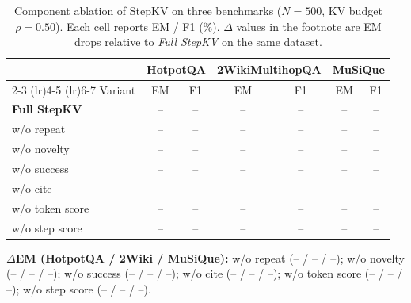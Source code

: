 %

\begin{table}[t]
\centering
\small
\setlength{\tabcolsep}{5pt}
\caption{Component ablation of StepKV on three benchmarks ($N=500$, KV budget $\rho=0.50$).
Each cell reports EM / F1 (\%).
$\Delta$ values in the footnote are EM drops relative to \textit{Full StepKV} on the same dataset.}
\label{tab:stepkv-ablation}
\begin{tabular}{lcccccc}
\toprule
& \multicolumn{2}{c}{HotpotQA} & \multicolumn{2}{c}{2WikiMultihopQA} & \multicolumn{2}{c}{MuSiQue} \\
\cmidrule(lr){2-3} \cmidrule(lr){4-5} \cmidrule(lr){6-7}
Variant & EM & F1 & EM & F1 & EM & F1 \\
\midrule
\textbf{Full StepKV} & -- & -- & -- & -- & -- & -- \\
w/o repeat           & -- & -- & -- & -- & -- & -- \\
w/o novelty          & -- & -- & -- & -- & -- & -- \\
w/o success          & -- & -- & -- & -- & -- & -- \\
w/o cite             & -- & -- & -- & -- & -- & -- \\
w/o token score      & -- & -- & -- & -- & -- & -- \\
w/o step score       & -- & -- & -- & -- & -- & -- \\
\bottomrule
\end{tabular}

\vspace{0.4em}
{\footnotesize
\textbf{$\Delta$EM (HotpotQA / 2Wiki / MuSiQue):}
w/o repeat (-- / -- / --);
w/o novelty (-- / -- / --);
w/o success (-- / -- / --);
w/o cite (-- / -- / --);
w/o token score (-- / -- / --);
w/o step score (-- / -- / --).
}
\end{table}
